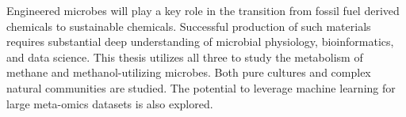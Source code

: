 Engineered microbes will play a key role in the transition from fossil fuel derived chemicals to sustainable chemicals.
Successful production of such materials requires substantial deep understanding of microbial physiology, bioinformatics, and data science.
This thesis utilizes all three to study the metabolism of methane and methanol-utilizing microbes.
Both pure cultures and complex natural communities are studied.
The potential to leverage machine learning for large meta-omics datasets is also explored.

